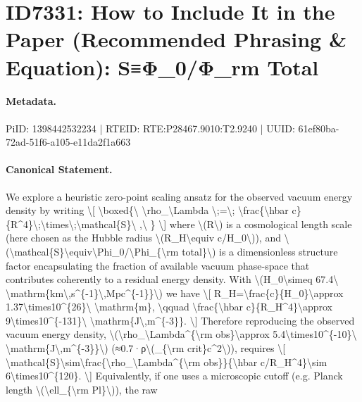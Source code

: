 \section*{ID7331: How to Include It in the Paper (Recommended Phrasing \& Equation): S≡Φ\_0/Φ\_rm Total}
\paragraph{Metadata.}
PiID: 1398442532234 | RTEID: RTE:P28467.9010:T2.9240 | UUID: 61ef80ba-72ad-51f6-a105-e11da2f1a663

\paragraph{Canonical Statement.}
We explore a heuristic zero-point scaling ansatz for the observed vacuum energy density by writing \textbackslash{}[ \textbackslash{}boxed\{\textbackslash{} \textbackslash{}rho\_\textbackslash{}Lambda \textbackslash{};=\textbackslash{}; \textbackslash{}frac\{\textbackslash{}hbar c\}\{R\textasciicircum{}4\}\textbackslash{};\textbackslash{}times\textbackslash{};\textbackslash{}mathcal\{S\}\textbackslash{} ,\textbackslash{} \} \textbackslash{}] where \textbackslash{}(R\textbackslash{}) is a cosmological length scale (here chosen as the Hubble radius \textbackslash{}(R\_H\textbackslash{}equiv c/H\_0\textbackslash{})), and \textbackslash{}(\textbackslash{}mathcal\{S\}\textbackslash{}equiv\textbackslash{}Phi\_0/\textbackslash{}Phi\_\{\textbackslash{}rm total\}\textbackslash{}) is a dimensionless structure factor encapsulating the fraction of available vacuum phase-space that contributes coherently to a residual energy density. With \textbackslash{}(H\_0\textbackslash{}simeq 67.4\textbackslash{} \textbackslash{}mathrm\{km\textbackslash{},s\textasciicircum{}\{-1\}\textbackslash{},Mpc\textasciicircum{}\{-1\}\}\textbackslash{}) we have \textbackslash{}[ R\_H=\textbackslash{}frac\{c\}\{H\_0\}\textbackslash{}approx 1.37\textbackslash{}times10\textasciicircum{}\{26\}\textbackslash{} \textbackslash{}mathrm\{m\}, \textbackslash{}qquad \textbackslash{}frac\{\textbackslash{}hbar c\}\{R\_H\textasciicircum{}4\}\textbackslash{}approx 9\textbackslash{}times10\textasciicircum{}\{-131\}\textbackslash{} \textbackslash{}mathrm\{J\textbackslash{},m\textasciicircum{}\{-3\}\}. \textbackslash{}] Therefore reproducing the observed vacuum energy density, \textbackslash{}(\textbackslash{}rho\_\textbackslash{}Lambda\textasciicircum{}\{\textbackslash{}rm obs\}\textbackslash{}approx 5.4\textbackslash{}times10\textasciicircum{}\{-10\}\textbackslash{} \textbackslash{}mathrm\{J\textbackslash{},m\textasciicircum{}\{-3\}\}\textbackslash{}) (≈0.7·ρ\textbackslash{}(\_\{\textbackslash{}rm crit\}c\textasciicircum{}2\textbackslash{})), requires \textbackslash{}[ \textbackslash{}mathcal\{S\}\textbackslash{}sim\textbackslash{}frac\{\textbackslash{}rho\_\textbackslash{}Lambda\textasciicircum{}\{\textbackslash{}rm obs\}\}\{\textbackslash{}hbar c/R\_H\textasciicircum{}4\}\textbackslash{}sim 6\textbackslash{}times10\textasciicircum{}\{120\}. \textbackslash{}] Equivalently, if one uses a microscopic cutoff (e.g. Planck length \textbackslash{}(\textbackslash{}ell\_\{\textbackslash{}rm Pl\}\textbackslash{})), the raw 